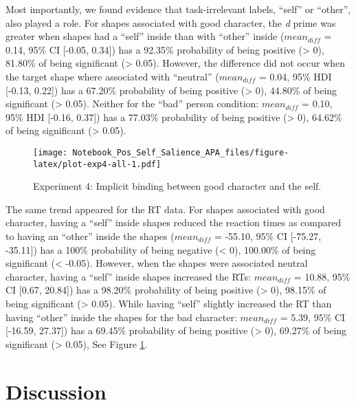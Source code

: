 \documentclass[
  man]{apa6}
\begin{document}
Most importantly, we found evidence that task-irrelevant labels, ``self'' or ``other'', also played a role. For shapes associated with good character, the \emph{d} prime was greater when shapes had a ``self'' inside than with ``other'' inside (\(mean_{diff}\) = 0.14, 95\% CI {[}-0.05, 0.34{]}) has a 92.35\% probability of being positive (\textgreater{} 0), 81.80\% of being significant (\textgreater{} 0.05). However, the difference did not occur when the target shape where associated with ``neutral'' (\(mean_{diff}\) = 0.04, 95\% HDI {[}-0.13, 0.22{]}) has a 67.20\% probability of being positive (\textgreater{} 0), 44.80\% of being significant (\textgreater{} 0.05). Neither for the ``bad'' person condition: \(mean_{diff}\) = 0.10, 95\% HDI {[}-0.16, 0.37{]}) has a 77.03\% probability of being positive (\textgreater{} 0), 64.62\% of being significant (\textgreater{} 0.05).

\begin{figure}
\centering
\texttt{[image: Notebook\_Pos\_Self\_Salience\_APA\_files/figure-latex/plot-exp4-all-1.pdf]}
\caption{\label{fig:plot-exp4-all}Experiment 4: Implicit binding between good character and the self.}
\end{figure}

The same trend appeared for the RT data. For shapes associated with good character, having a ``self'' inside shapes reduced the reaction times as compared to having an ``other'' inside the shapes (\(mean_{diff}\) = -55.10, 95\% CI {[}-75.27, -35.11{]}) has a 100\% probability of being negative (\textless{} 0), 100.00\% of being significant (\textless{} -0.05). However, when the shapes were associated neutral character, having a ``self'' inside shapes increased the RTs: \(mean_{diff}\) = 10.88, 95\% CI {[}0.67, 20.84{]}) has a 98.20\% probability of being positive (\textgreater{} 0), 98.15\% of being significant (\textgreater{} 0.05). While having ``self'' slightly increased the RT than having ``other'' inside the shapes for the bad character: \(mean_{diff}\) = 5.39, 95\% CI {[}-16.59, 27.37{]}) has a 69.45\% probability of being positive (\textgreater{} 0), 69.27\% of being significant (\textgreater{} 0.05), See Figure \ref{fig:plot-exp4-all}.

\hypertarget{discussion}{%
\section{Discussion}\label{discussion}}
\end{document}
